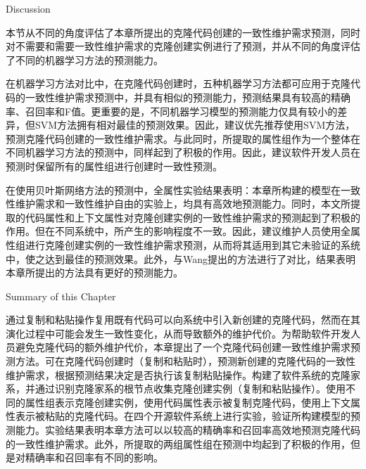 {Discussion}

本节从不同的角度评估了本章所提出的克隆代码创建的一致性维护需求预测，同时对不需要和需要一致性维护需求的克隆创建实例进行了预测，并从不同的角度评估了不同的机器学习方法的预测能力。

在机器学习方法对比中，在克隆代码创建时，五种机器学习方法都可应用于克隆代码的一致性维护需求预测中，并具有相似的预测能力，预测结果具有较高的精确率、召回率和F值。更重要的是，不同机器学习模型的预测能力仅具有较小的差异，但SVM方法拥有相对最佳的预测效果。因此，建议优先推荐使用SVM方法，预测克隆代码创建的一致性维护需求。与此同时，所提取的属性组作为一个整体在不同机器学习方法的预测中，同样起到了积极的作用。因此，建议软件开发人员在预测时保留所有的属性组进行创建时一致性预测。

在使用贝叶斯网络方法的预测中，全属性实验结果表明：本章所构建的模型在一致性维护需求和一致性维护自由的实验上，均具有高效地预测能力。同时，本文所提取的代码属性和上下文属性对克隆创建实例的一致性维护需求的预测起到了积极的作用。但在不同系统中，所产生的影响程度不一致。因此，建议维护人员使用全属性组进行克隆创建实例的一致性维护需求预测，从而将其适用到其它未验证的系统中，使之达到最佳的预测效果。此外，与Wang提出的方法进行了对比，结果表明本章所提出的方法具有更好的预测能力。

{Summary of this Chapter}

通过复制和粘贴操作复用既有代码可以向系统中引入新创建的克隆代码，然而在其演化过程中可能会发生一致性变化，从而导致额外的维护代价。为帮助软件开发人员避免克隆代码的额外维护代价，本章提出了一个克隆代码创建一致性维护需求预测方法。可在克隆代码创建时（复制和粘贴时），预测新创建的克隆代码的一致性维护需求，根据预测结果决定是否执行该复制粘贴操作。构建了软件系统的克隆家系，并通过识别克隆家系的根节点收集克隆创建实例（复制和粘贴操作）。使用不同的属性组表示克隆创建实例，使用代码属性表示被复制克隆代码，使用上下文属性表示被粘贴的克隆代码。在四个开源软件系统上进行实验，验证所构建模型的预测能力。实验结果表明本章方法可以以较高的精确率和召回率高效地预测克隆代码的一致性维护需求。此外，所提取的两组属性组在预测中均起到了积极的作用，但是对精确率和召回率有不同的影响。

